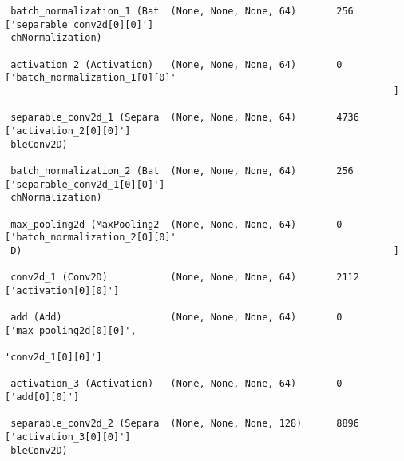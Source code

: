 \documentclass[
  letterpaper,
  DIV=11,
  numbers=noendperiod]{scrreprt}
\begin{document}
\begin{verbatim}
 batch_normalization_1 (Bat  (None, None, None, 64)       256       ['separable_conv2d[0][0]']    
 chNormalization)                                                                                 
                                                                                                  
 activation_2 (Activation)   (None, None, None, 64)       0         ['batch_normalization_1[0][0]'
                                                                    ]                             
                                                                                                  
 separable_conv2d_1 (Separa  (None, None, None, 64)       4736      ['activation_2[0][0]']        
 bleConv2D)                                                                                       
                                                                                                  
 batch_normalization_2 (Bat  (None, None, None, 64)       256       ['separable_conv2d_1[0][0]']  
 chNormalization)                                                                                 
                                                                                                  
 max_pooling2d (MaxPooling2  (None, None, None, 64)       0         ['batch_normalization_2[0][0]'
 D)                                                                 ]                             
                                                                                                  
 conv2d_1 (Conv2D)           (None, None, None, 64)       2112      ['activation[0][0]']          
                                                                                                  
 add (Add)                   (None, None, None, 64)       0         ['max_pooling2d[0][0]',       
                                                                     'conv2d_1[0][0]']            
                                                                                                  
 activation_3 (Activation)   (None, None, None, 64)       0         ['add[0][0]']                 
                                                                                                  
 separable_conv2d_2 (Separa  (None, None, None, 128)      8896      ['activation_3[0][0]']        
 bleConv2D)                                                                                       
                                                                                                  

\end{verbatim}
\end{document}
